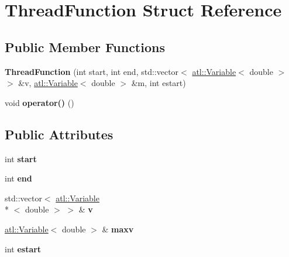 \hypertarget{struct_thread_function}{\section{Thread\+Function Struct Reference}
\label{struct_thread_function}
}
\subsection*{Public Member Functions}
\begin{DoxyCompactItemize}
\item 
\hypertarget{struct_thread_function_a0c805c4816d400a48e130c7678781864}{{\bfseries Thread\+Function} (int start, int end, std\+::vector$<$ \hyperlink{structatl_1_1_variable}{atl\+::\+Variable}$<$ double $>$ $>$ \&v, \hyperlink{structatl_1_1_variable}{atl\+::\+Variable}$<$ double $>$ \&m, int estart)}\label{struct_thread_function_a0c805c4816d400a48e130c7678781864}

\item 
\hypertarget{struct_thread_function_aba725fb009acea384e8bbc7dda37e1ac}{void {\bfseries operator()} ()}\label{struct_thread_function_aba725fb009acea384e8bbc7dda37e1ac}

\end{DoxyCompactItemize}
\subsection*{Public Attributes}
\begin{DoxyCompactItemize}
\item 
\hypertarget{struct_thread_function_ac325eb85204edea0589a0ec74c5031e6}{int {\bfseries start}}\label{struct_thread_function_ac325eb85204edea0589a0ec74c5031e6}

\item 
\hypertarget{struct_thread_function_a1156a7146122601aa9fadb69a128de3b}{int {\bfseries end}}\label{struct_thread_function_a1156a7146122601aa9fadb69a128de3b}

\item 
\hypertarget{struct_thread_function_a4be77062174107b85dc9abd350d56a1b}{std\+::vector$<$ \hyperlink{structatl_1_1_variable}{atl\+::\+Variable}\\*
$<$ double $>$ $>$ \& {\bfseries v}}\label{struct_thread_function_a4be77062174107b85dc9abd350d56a1b}

\item 
\hypertarget{struct_thread_function_a79b606f5addb749a99b0b01e63179383}{\hyperlink{structatl_1_1_variable}{atl\+::\+Variable}$<$ double $>$ \& {\bfseries maxv}}\label{struct_thread_function_a79b606f5addb749a99b0b01e63179383}

\item 
\hypertarget{struct_thread_function_adc46ddcc785ec62c6a458d80a486eb8a}{int {\bfseries estart}}\label{struct_thread_function_adc46ddcc785ec62c6a458d80a486eb8a}

\end{DoxyCompactItemize}


